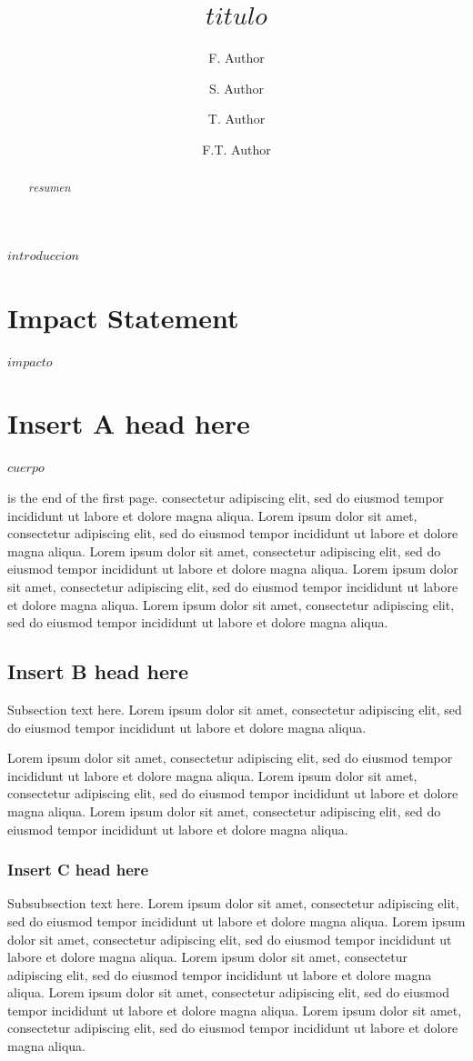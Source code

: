 \documentclass[
  journal=large,
  manuscript=propuesta,
  year=2020,
  volume=37,
]{cup-journal}
\title{$titulo$}
\author{F. Author}
\affiliation{First Division, Organization, City, Pincode, State, Country}
\author{S. Author}
\affiliation{Second Division, Organization, City, Pincode, State, Country}
\author{T. Author}
\affiliation{Second Division, Organization, City, Pincode, State, Country}
\author{F.T. Author}
\affiliation{Fourth Division, Organization, City, Pincode, State, Country}
\begin{document}
\begin{abstract}
$resumen$
\end{abstract}

\noindent $introduccion$

\section*{Impact Statement}

$impacto$

\section{Insert A head here}
$cuerpo$

\CUPTWOCOL 
is the end of the first page. 
consectetur adipiscing elit, sed do eiusmod tempor incididunt ut labore et dolore magna aliqua. Lorem ipsum dolor sit amet, consectetur adipiscing elit, sed do eiusmod tempor incididunt ut labore et dolore magna aliqua. Lorem ipsum dolor sit amet, consectetur adipiscing elit, sed do eiusmod tempor incididunt ut labore et dolore magna aliqua. Lorem ipsum dolor sit amet, consectetur adipiscing elit, sed do eiusmod tempor incididunt ut labore et dolore magna aliqua. Lorem ipsum dolor sit amet, consectetur adipiscing elit, sed do eiusmod tempor incididunt ut labore et dolore magna aliqua. 

\subsection{Insert B head here}
Subsection text here. Lorem ipsum \citep{Bayer_etal_2013} dolor sit amet, consectetur adipiscing elit, sed do eiusmod tempor incididunt ut labore \citet{Adade_etal_2007} et dolore magna aliqua. 

 Lorem ipsum dolor sit amet, consectetur adipiscing elit, sed do eiusmod tempor incididunt ut labore et dolore magna aliqua. Lorem ipsum dolor sit amet, consectetur adipiscing elit, sed do eiusmod tempor incididunt ut labore et dolore magna aliqua. Lorem ipsum dolor sit amet, consectetur adipiscing elit, sed do eiusmod tempor incididunt ut labore et dolore magna aliqua. 

\subsubsection{Insert C head here}
Subsubsection text here. Lorem ipsum dolor sit amet, consectetur adipiscing elit, sed do eiusmod tempor incididunt ut labore et dolore magna aliqua. Lorem ipsum dolor sit amet, consectetur adipiscing elit, sed do eiusmod tempor incididunt ut labore et dolore magna aliqua. Lorem ipsum dolor sit amet, consectetur adipiscing elit, sed do eiusmod tempor incididunt ut labore et dolore magna aliqua. Lorem ipsum dolor sit amet, consectetur adipiscing elit, sed do eiusmod tempor incididunt ut labore et dolore magna aliqua. Lorem ipsum dolor sit amet, consectetur adipiscing elit, sed do eiusmod tempor incididunt ut labore et dolore magna aliqua. 
\end{document}
